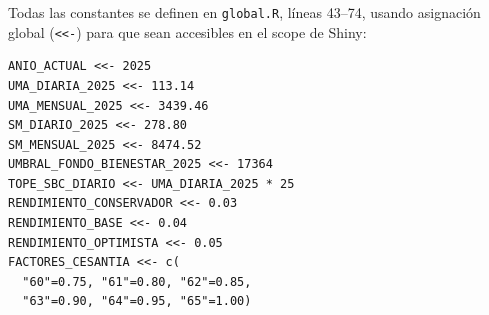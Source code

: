 \documentclass[11pt,a4paper]{report}
\theoremstyle{remark}
\begin{document}
\begin{tcolorbox}[colback=orange!5!white, colframe=orange!75!black, title=\textbf{Aplicaci\'on en C\'odigo}]
Todas las constantes se definen en \texttt{global.R}, l\'ineas 43--74, usando asignaci\'on global (\texttt{<<-}) para que sean accesibles en el scope de Shiny:
\begin{lstlisting}
ANIO_ACTUAL <<- 2025
UMA_DIARIA_2025 <<- 113.14
UMA_MENSUAL_2025 <<- 3439.46
SM_DIARIO_2025 <<- 278.80
SM_MENSUAL_2025 <<- 8474.52
UMBRAL_FONDO_BIENESTAR_2025 <<- 17364
TOPE_SBC_DIARIO <<- UMA_DIARIA_2025 * 25
RENDIMIENTO_CONSERVADOR <<- 0.03
RENDIMIENTO_BASE <<- 0.04
RENDIMIENTO_OPTIMISTA <<- 0.05
FACTORES_CESANTIA <<- c(
  "60"=0.75, "61"=0.80, "62"=0.85,
  "63"=0.90, "64"=0.95, "65"=1.00)
\end{lstlisting}
\end{tcolorbox}
\end{document}
